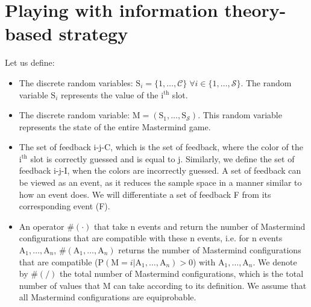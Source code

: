 \documentclass{article}
\begin{document}
\section{Playing with information theory-based strategy}
Let us define:
\begin{itemize}
    \item The discrete random variables: $\mbox{S}_i = \{1,\dots,\mathcal{C}\}\;\forall i \in \{1,\dots,\mathcal{S}\}$. The random variable $\mbox{S}_i$ represents the value of the $\mbox{i}^{\mbox{th}}$ slot.
    \item The discrete random variable: $\mbox{M} = (\mbox{S}_1, \dots,\mbox{S}_{\mathcal{S}}) $. This random variable represents the state of the entire Mastermind game.
    \item The set of feedback i-j-C, which is the set of feedback, where the color of the $\mbox{i}^{\mbox{th}}$ slot is correctly guessed and is equal to j. Similarly, we define the set of feedback i-j-I, when the colors are incorrectly guessed. A set of feedback can be viewed as an event, as it reduces the sample space in a manner similar to how an event does. We will differentiate a set of feedback F from its corresponding event (F).
    \item An operator $\#(\cdot)$ that take n events and return the number of Mastermind configurations that are compatible with these n events, i.e. for n events $\mbox{A}_1,\dots,\mbox{A}_n$, $\#(\mbox{A}_1,\dots,\mbox{A}_n)$ returns the number of Mastermind configurations that are compatible ($\mbox{P}(\mbox{M}=i|\mbox{A}_1,\dots,\mbox{A}_n)>0$) with $\mbox{A}_1,\dots,\mbox{A}_n$. We denote by $\#(/)$ the total number of Mastermind configurations, which is the total number of values that M can take according to its definition. We assume that all Mastermind configurations are equiprobable.
\end{itemize}
\end{document}
